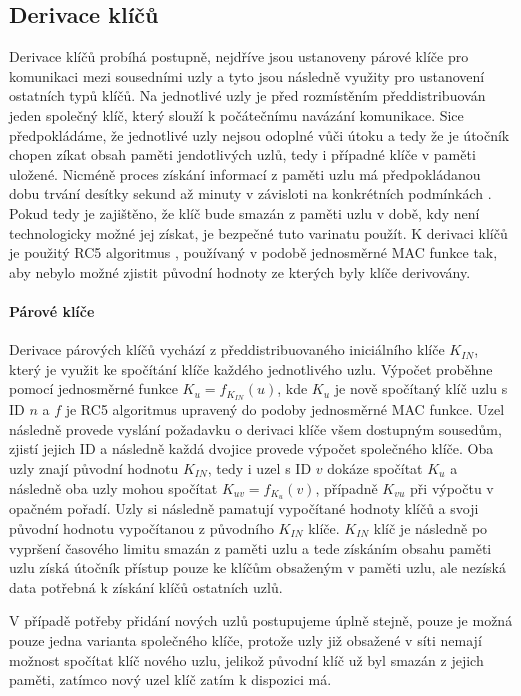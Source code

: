 \documentclass[11pt,final,twoside]{fithesis2}
\begin{document}
\subsection{Derivace klíčů}

Derivace klíčů probíhá postupně, nejdříve jsou ustanoveny párové klíče pro komunikaci mezi sousedními uzly a tyto jsou následně využity pro ustanovení ostatních typů klíčů. 
Na jednotlivé uzly je před rozmístěním předdistribuován jeden společný klíč, který slouží k počátečnímu navázání komunikace. Sice předpokládáme, že jednotlivé uzly nejsou odoplné vůči 
útoku a tedy že je útočník chopen zíkat obsah paměti jendotlivých uzlů, tedy i případné klíče v paměti uložené. Nicméně proces získání informací z paměti uzlu má předpokládanou dobu trvání desítky sekund 
až minuty v závisloti na konkrétních podmínkách \cite{Deng2005}. Pokud tedy je zajištěno, že klíč bude smazán z paměti uzlu v době, kdy není technologicky možné jej získat, je bezpečné tuto varinatu použít.
K derivaci klíčů je použitý RC5 algoritmus \cite{Rivest1995}, používaný v podobě jednosměrné MAC funkce tak, aby nebylo možné zjistit původní hodnoty ze kterých byly klíče derivovány.

\paragraph{Párové klíče} 
Derivace párových klíčů vychází z předdistribuovaného iniciálního klíče $K_{IN}$, který je využit ke spočítání klíče každého jednotlivého uzlu. Výpočet proběhne pomocí jednosměrné funkce 
$K_u=f_{K_{IN}}(u)$, kde $K_u$ je nově spočítaný klíč uzlu s ID $n$ a $f$ je RC5 algoritmus upravený do podoby jednosměrné MAC funkce. Uzel následně provede vyslání požadavku o derivaci klíče všem dostupným 
sousedům, zjistí jejich ID a následně každá dvojice provede výpočet společného klíče. Oba uzly znají původní hodnotu $K_{IN}$, tedy i uzel s ID $v$ dokáze spočítat $K_u$ a následně oba uzly mohou spočítat
$K_{uv} = f_{K_{u}}(v)$, případně $K_{vu}$ při výpočtu v opačném pořadí. Uzly si následně pamatují vypočítané hodnoty klíčů a svoji původní hodnotu vypočítanou z původního $K_{IN}$ klíče. 
$K_{IN}$ klíč je následně po vypršení časového limitu smazán z paměti uzlu a tede získáním obsahu paměti uzlu získá útočník přístup pouze ke klíčům obsaženým v paměti uzlu, ale nezíská data potřebná k 
získání klíčů ostatních uzlů.

V případě potřeby přidání nových uzlů postupujeme úplně stejně, pouze je možná pouze jedna varianta společného klíče, protože uzly již obsažené v síti nemají možnost spočítat klíč nového uzlu, jelikož 
původní klíč už byl smazán z jejich paměti, zatímco nový uzel klíč zatím k dispozici má. 
\end{document}
